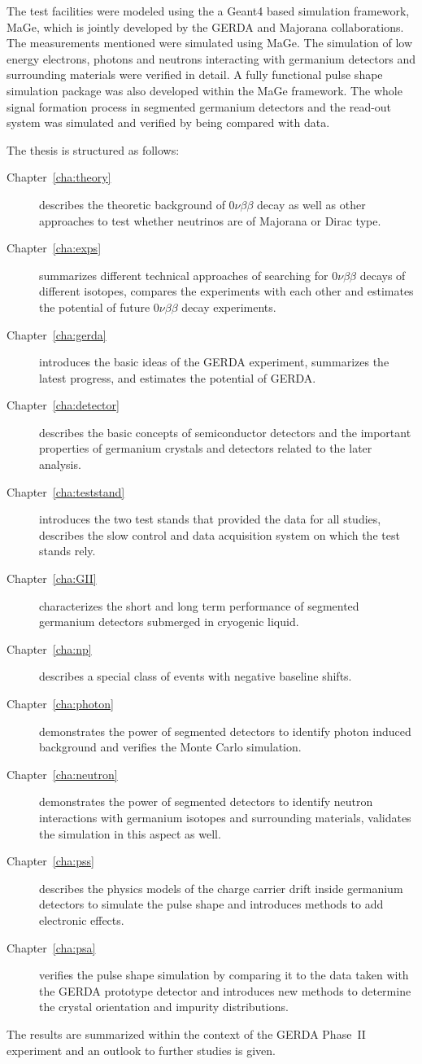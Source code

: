 The test facilities were modeled using the a Geant4 based simulation framework, MaGe, which is jointly developed by the GERDA and Majorana collaborations. The measurements mentioned were simulated using MaGe. The simulation of low energy electrons, photons and neutrons interacting with germanium detectors and surrounding materials were verified in detail. A fully functional pulse shape simulation package was also developed within the MaGe framework. The whole signal formation process in segmented germanium detectors and the read-out system was simulated and verified by being compared with data. 

The thesis is structured as follows:
\begin{description}
\item[Chapter~\ref{cha:theory}] describes the theoretic background of $0\nu\beta\beta$ decay as well as other approaches to test whether neutrinos are of Majorana or Dirac type.
\item[Chapter~\ref{cha:exps}] summarizes different technical approaches of searching for $0\nu\beta\beta$ decays of different isotopes, compares the experiments with each other and estimates the potential of future $0\nu\beta\beta$ decay experiments.
\item[Chapter~\ref{cha:gerda}] introduces the basic ideas of the GERDA experiment, summarizes the latest progress, and estimates the potential of GERDA.
\item[Chapter~\ref{cha:detector}] describes the basic concepts of semiconductor detectors and the important properties of germanium crystals and detectors related to the later analysis.
\item[Chapter~\ref{cha:teststand}] introduces the two test stands that provided the data for all studies, describes the slow control and data acquisition system on which the test stands rely.
\item[Chapter~\ref{cha:GII}] characterizes the short and long term performance of segmented germanium detectors submerged in cryogenic liquid.
\item[Chapter~\ref{cha:np}] describes a special class of events with negative baseline shifts.
\item[Chapter~\ref{cha:photon}] demonstrates the power of segmented detectors to identify photon induced background and verifies the Monte Carlo simulation.
\item[Chapter~\ref{cha:neutron}] demonstrates the power of segmented detectors to identify neutron interactions with germanium isotopes and surrounding materials, validates the simulation in this aspect as well.
\item[Chapter~\ref{cha:pss}] describes the physics models of the charge carrier drift inside germanium detectors to simulate the pulse shape and introduces methods to add electronic effects.
\item[Chapter~\ref{cha:psa}] verifies the pulse shape simulation by comparing it to the data taken with the GERDA prototype detector and introduces new methods to determine the crystal orientation and impurity distributions.
\end{description}
The results are summarized within the context of the GERDA Phase~II experiment and an outlook to further studies is given.



